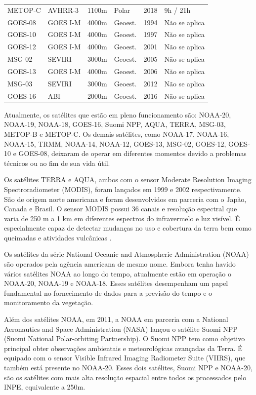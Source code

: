 \documentclass[cic,tc]{iiufrgs}
\begin{document}
\begin{table}[htbp]
\begin{tabular}{ @{}llllcl@{} }
  METOP-C & AVHRR-3  & 1100m       & Polar   & 2018 & 9h / 21h \\
  GOES-08 & GOES I-M & 4000m       & Geoest. & 1994 & Não se aplica \\
  GOES-10 & GOES I-M & 4000m       & Geoest. & 1997 & Não se aplica \\
  GOES-12 & GOES I-M & 4000m       & Geoest. & 2001 & Não se aplica \\
  MSG-02  & SEVIRI   & 3000m       & Geoest. & 2005 & Não se aplica \\
  GOES-13 & GOES I-M & 4000m       & Geoest. & 2006 & Não se aplica \\
  MSG-03  & SEVIRI   & 3000m       & Geoest. & 2012 & Não se aplica \\
  GOES-16 & ABI      & 2000m       & Geoest. & 2016 & Não se aplica \\
  \bottomrule
\end{tabular}
\label{table:satelites}
\end{table}

Atualmente, os satélites que estão em pleno funcionamento são: NOAA-20, NOAA-19, NOAA-18, GOES-16, Suomi NPP, AQUA, TERRA, MSG-03, METOP-B e METOP-C. Os demais satélites, como NOAA-17, NOAA-16, NOAA-15, TRMM, NOAA-14, NOAA-12, GOES-13, MSG-02, GOES-12, GOES-10 e GOES-08, deixaram de operar em diferentes momentos devido a problemas técnicos ou ao fim de sua vida útil.

Os satélites TERRA e AQUA, ambos com o sensor Moderate Resolution Imaging Spectroradiometer (MODIS), foram lançados em 1999 e 2002 respectivamente. São de origem norte americana e foram desenvolvidos em parceria com o Japão, Canada e Brasil. O sensor MODIS possui 36 canais e resolução espectral que varia de 250 m a 1 km em diferentes espectros do infravermelo e luz visível. É especialmente capaz de detectar mudanças no uso e cobertura da terra bem como queimadas e atividades vulcânicas \citep{latorre2003}.

Os satélites da série National Oceanic and Atmospheric Administration (NOAA) são operados pela agência americana de mesmo nome. Embora tenha havido vários satélites NOAA ao longo do tempo, atualmente estão em operação o NOAA-20, NOAA-19 e NOAA-18. Esses satélites desempenham um papel fundamental no fornecimento de dados para a previsão do tempo e o monitoramento da vegetação. 

Além dos satélites NOAA, em 2011, a NOAA em parceria com a National Aeronautics and Space Administration (NASA) lançou o satélite Suomi NPP (Suomi National Polar-orbiting Partnership). O Suomi NPP tem como objetivo principal obter observações ambientais e meteorológicas avançadas da Terra. É equipado com o sensor Visible Infrared Imaging Radiometer Suite (VIIRS), que também está presente no NOAA-20. Esses dois satélites, Suomi NPP e NOAA-20, são os satélites com mais alta resolução espacial entre todos os processados pelo INPE, equivalente a 250m.
\end{document}

